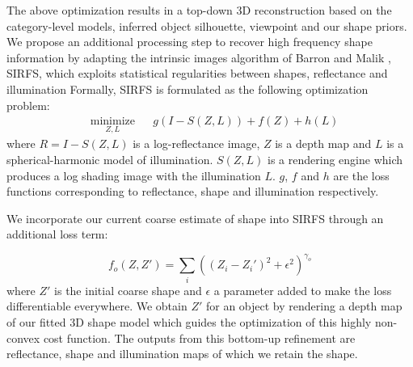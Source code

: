 The above optimization results in a top-down 3D reconstruction based on the category-level models, inferred object silhouette, viewpoint and our shape priors. We propose an additional processing step to recover high frequency shape information by adapting the intrinsic images algorithm of Barron and Malik \cite{barronPAMI13,Barron2012B}, SIRFS, which exploits statistical regularities between shapes, reflectance and illumination 
Formally, SIRFS is formulated as the following optimization problem:
\begin{equation}
\begin{aligned}
& \underset{Z,L}{\text{minimize}}
& & g(I-S(Z,L))+f(Z)+h(L)
\end{aligned}
\end{equation}
where $R=I-S(Z,L)$ is a log-reflectance image, $Z$ is a depth map and $L$ is a spherical-harmonic model of illumination. $S(Z,L)$ is a rendering engine which produces a log shading image with the illumination $L$. $g$, $f$ and $h$ are the loss functions corresponding to reflectance, shape and illumination respectively.

We incorporate our current coarse estimate of shape into SIRFS through an additional loss term:

\begin{equation}
f_o(Z,Z') = \underset{i}{\sum}((Z_i-Z_i')^2+\epsilon^2)^{\gamma_o}
\end{equation}
where $Z'$ is the initial coarse shape and $\epsilon$ a parameter added to make the loss differentiable everywhere. We obtain $Z'$ for an object by rendering a depth map of our fitted 3D shape model which guides the optimization of this highly non-convex cost function. The outputs from this bottom-up refinement are reflectance, shape and illumination maps of which we retain the shape.
